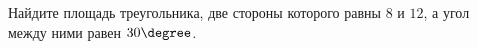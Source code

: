 \begin{ex}
	\begin{condition}
		Найдите площадь треугольника, две стороны которого равны \( 8 \) и \( 12 \), а угол между ними равен \( 30\degree \).
	\end{condition}
\end{ex}